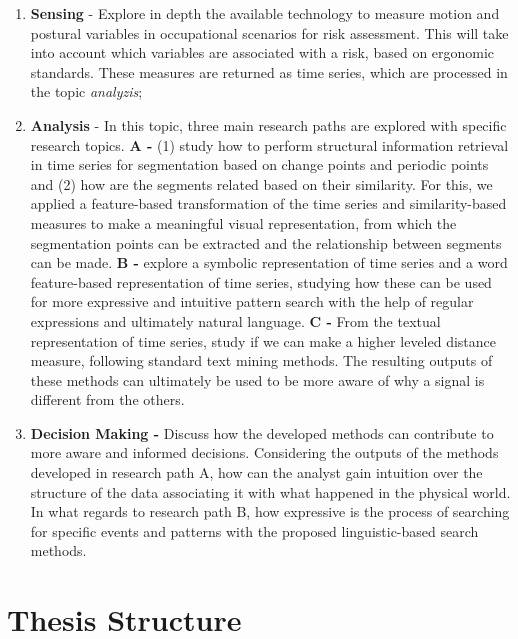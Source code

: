 \begin{enumerate}

\item \textbf{Sensing} - Explore in depth the available technology to measure motion and postural variables in occupational scenarios for risk assessment. This will take into account which variables are associated with a risk, based on ergonomic standards. These measures are returned as time series, which are processed in the topic \textit{analyzis};

\item \textbf{Analysis} - In this topic, three main research paths are explored with specific research topics. \textbf{A -} (1) study how to perform structural information retrieval in time series for segmentation based on change points and periodic points and (2) how are the segments related based on their similarity. For this, we applied a feature-based transformation of the time series and similarity-based measures to make a meaningful visual representation, from which the segmentation points can be extracted and the relationship between segments can be made. \textbf{B -} explore a symbolic representation of time series and a word feature-based representation of time series, studying how these can be used for more expressive and intuitive pattern search with the help of regular expressions and ultimately natural language. \textbf{C -} From the textual representation of time series, study if we can make a higher leveled distance measure, following standard text mining methods. The resulting outputs of these methods can ultimately be used to be more aware of why a signal is different from the others.

\item \textbf{Decision Making -} Discuss how the developed methods can contribute to more aware and informed decisions. Considering the outputs of the methods developed in research path A, how can the analyst gain intuition over the structure of the data associating it with what happened in the physical world. In what regards to research path B, how expressive is the process of searching for specific events and patterns with the proposed linguistic-based search methods.

\end{enumerate}

\section{Thesis Structure}
\label{sec:structure}

